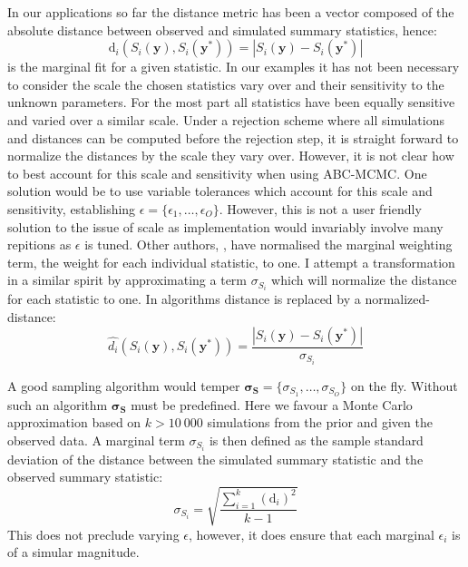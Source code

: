 In our applications so far the distance metric has been a vector composed of the absolute distance between observed and simulated summary statistics, hence:
\begin{equation}
\text{d}_i(S_i(\bm{y}),S_i(\bm{y^*})) = |S_i(\bm{y})-S_i(\bm{y^*})|
\end{equation}
is the marginal fit for a given statistic. In our examples it has not been necessary to consider the scale the chosen statistics vary over and their sensitivity to the unknown parameters. For the most part all statistics have been equally sensitive and varied over a similar scale. Under a rejection scheme where all simulations and distances can be computed before the rejection step, it is straight forward to normalize the distances by the scale they vary over. However, it is not clear how to best account for this scale and sensitivity when using ABC-MCMC. One solution would be to use variable tolerances which account for this scale and sensitivity, establishing $\epsilon = \{\epsilon_1,\dots,\epsilon_O\}$. However, this is not a user friendly solution to the issue of scale as implementation would invariably involve many repitions as $\epsilon$ is tuned. Other authors, \citet{Ratmann2010}, have normalised the marginal weighting term, the weight for each individual statistic, to one. I attempt a transformation in a similar spirit by approximating a term $\sigma_{S_i}$ which will normalize the distance for each statistic to one. In algorithms distance is replaced by a normalized-distance:
\begin{equation}
\hat{d_i}(S_i(\bm{y}),S_i(\bm{y^*})) =  \frac{|S_i(\bm{y})-S_i(\bm{y^*})|}{\sigma_{S_i}}
\end{equation}

A good sampling algorithm would temper $\bm{\sigma_S} = \{\sigma_{S_1},\dots,\sigma_{S_O}\}$ on the fly. Without such an algorithm $\bm{\sigma_S}$ must be predefined. Here we favour a Monte Carlo approximation based on $k > 10\ 000$ simulations from the prior and given the observed data. A marginal term $\sigma_{S_i}$ is then defined as the sample standard deviation of the distance between the simulated summary statistic and the observed summary statistic:
\begin{equation}
\sigma_{S_i} = \sqrt{\frac{\sum_{i = 1}^{k}(\text{d}_i)^2}{k-1}}
\end{equation}
This does not preclude varying $\epsilon$, however, it does ensure that each marginal $\epsilon_i$ is of a simular magnitude. \\



